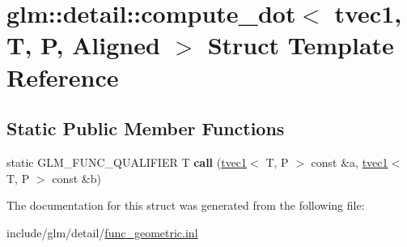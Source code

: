\hypertarget{structglm_1_1detail_1_1compute__dot_3_01tvec1_00_01T_00_01P_00_01Aligned_01_4}{}\section{glm\+:\+:detail\+:\+:compute\+\_\+dot$<$ tvec1, T, P, Aligned $>$ Struct Template Reference}
\label{structglm_1_1detail_1_1compute__dot_3_01tvec1_00_01T_00_01P_00_01Aligned_01_4}
\subsection*{Static Public Member Functions}
\begin{DoxyCompactItemize}
\item 
\mbox{\label{structglm_1_1detail_1_1compute__dot_3_01tvec1_00_01T_00_01P_00_01Aligned_01_4_aaee5dcefecbec5a8bdec58b7b0f7deaf}} 
static G\+L\+M\+\_\+\+F\+U\+N\+C\+\_\+\+Q\+U\+A\+L\+I\+F\+I\+ER T {\bfseries call} (\hyperlink{structglm_1_1tvec1}{tvec1}$<$ T, P $>$ const \&a, \hyperlink{structglm_1_1tvec1}{tvec1}$<$ T, P $>$ const \&b)
\end{DoxyCompactItemize}


The documentation for this struct was generated from the following file\+:\begin{DoxyCompactItemize}
\item 
include/glm/detail/\hyperlink{func__geometric_8inl}{func\+\_\+geometric.\+inl}\end{DoxyCompactItemize}
